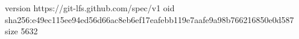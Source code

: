 version https://git-lfs.github.com/spec/v1
oid sha256:e49ec115ee94ed56d66ac8eb6ef17eafebb119e7aafe9a98b766216850e0d587
size 5632

